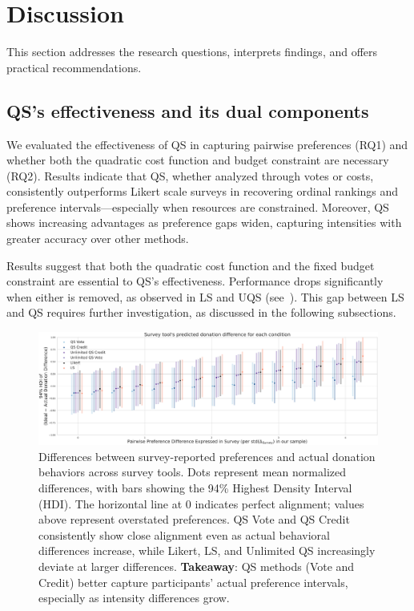 \section{Discussion}
\label{sec:discussion}
This section addresses the research questions, interprets findings, and offers practical recommendations.

\subsection{QS's effectiveness and its dual components}
We evaluated the effectiveness of QS in capturing pairwise preferences (RQ1) and whether both the quadratic cost function and budget constraint are necessary (RQ2). Results indicate that QS, whether analyzed through votes or costs, consistently outperforms Likert scale surveys in recovering ordinal rankings and preference intervals—especially when resources are constrained. Moreover, QS shows increasing advantages as preference gaps widen, capturing intensities with greater accuracy over other methods.

Results suggest that both the quadratic cost function and the fixed budget constraint are essential to QS’s effectiveness. Performance drops significantly when either is removed, as observed in LS and UQS (see~). This gap between LS and QS requires further investigation, as discussed in the following subsections.






\begin{figure}[h]
    \centering
    \includegraphics[width=\textwidth]{content/image/posterior_predictive_cumulative.pdf}
    \caption[]{Differences between survey-reported preferences and actual donation behaviors across survey tools. Dots represent mean normalized differences, with bars showing the 94\% Highest Density Interval (HDI). The horizontal line at 0 indicates perfect alignment; values above represent overstated preferences. QS Vote and QS Credit consistently show close alignment even as actual behavioral differences increase, while Likert, LS, and Unlimited QS increasingly deviate at larger differences. \textbf{Takeaway}: QS methods (Vote and Credit) better capture participants' actual preference intervals, especially as intensity differences grow.}
    \label{fig:comparison}
\end{figure}

